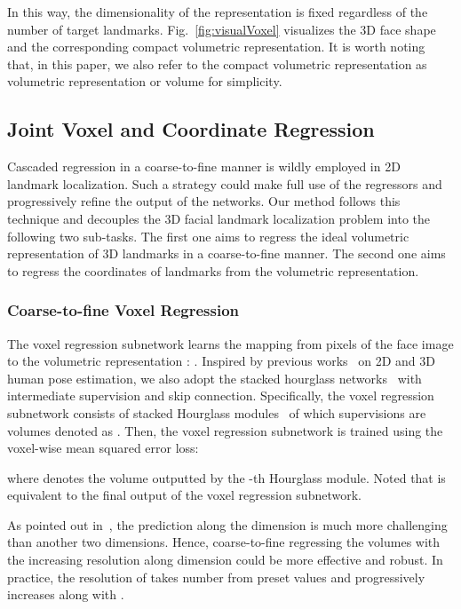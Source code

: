 \documentclass[a4paper,conference]{IEEEtran}
\begin{document}
In this way, the dimensionality of the representation is fixed regardless of the number of target landmarks. 
Fig.~\ref{fig:visualVoxel} visualizes the 3D face shape and the corresponding compact volumetric representation.
It is worth noting that, in this paper, we also refer to the compact volumetric representation as volumetric representation or volume for simplicity.



\subsection{Joint Voxel and Coordinate Regression}

Cascaded regression in a coarse-to-fine manner is wildly employed in 2D landmark localization.
Such a strategy could make full use of the regressors and progressively refine the output of the networks.
Our method follows this technique and decouples the 3D facial landmark localization problem into the following two sub-tasks.
The first one aims to regress the ideal volumetric representation of 3D landmarks in a coarse-to-fine manner.
The second one aims to regress the coordinates of landmarks from the volumetric representation.

\subsubsection{Coarse-to-fine Voxel Regression}
The voxel regression subnetwork  learns the mapping from pixels of the face image  to the volumetric representation : 
.
Inspired by previous works~\cite{newell2016stacked,pavlakos2017coarse} on 2D and 3D human pose estimation, we also adopt the stacked hourglass networks~\cite{newell2016stacked} with intermediate supervision and skip connection.
Specifically, the voxel regression subnetwork consists of  stacked Hourglass modules~\cite{newell2016stacked} of which supervisions are volumes denoted as .
Then, the voxel regression subnetwork is trained using the voxel-wise mean squared error loss:

where  denotes the volume outputted by the -th Hourglass module. Noted that  is equivalent to the final output of the voxel regression subnetwork.

As pointed out in~\cite{pavlakos2017coarse}, the prediction along the  dimension is much more challenging than another two dimensions.
Hence, coarse-to-fine regressing the volumes with the increasing resolution along  dimension could be more effective and robust.
In practice, the resolution  of  takes number from preset values and progressively increases along with .
\end{document}

